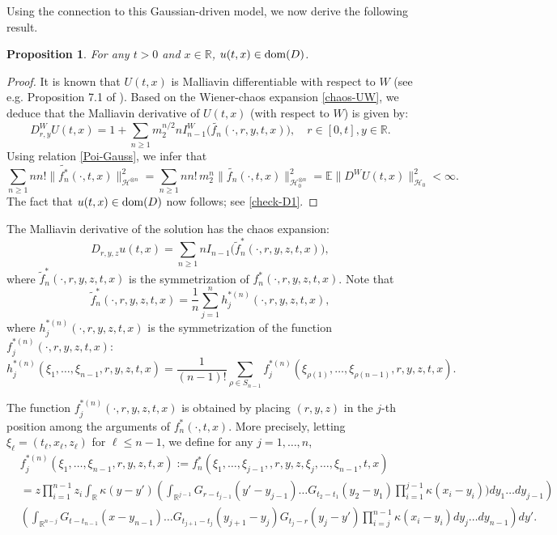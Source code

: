 \documentclass[12pt]{article}
\newtheorem{proposition}[theorem]{Proposition}
\def\cH{\mathcal{H}}
\def\bE{\mathbb{E}}
\def\bR{\mathbb{R}}
\def\k{\kappa}
\begin{document}
\medskip

Using the connection to this Gaussian-driven model, we now derive the following result.

\begin{proposition}
\label{u-Mall1}
For any $t>0$ and $x \in \bR$, $u(t,x) \in {\rm dom}(D)$.
\end{proposition}

\begin{proof}
It is known that
$U(t,x)$ is Malliavin differentiable with respect to $W$ (see e.g. Proposition 7.1 of \cite{sanz05}). Based on the Wiener-chaos expansion \eqref{chaos-UW}, we deduce that the Malliavin derivative of $U(t,x)$ (with respect to $W$) is given by:
\[
D_{r,y}^W U(t,x)=1+\sum_{n\geq 1}m_2^{n/2}nI_{n-1}^W\big(\widetilde{f_n}(\cdot,r,y,t,x)\big), \quad r \in [0,t],y \in \bR.
\]
Using relation \eqref{Poi-Gauss}, we infer that
\[
\sum_{n\geq 1}n n! \|\widetilde{f_n^*}(\cdot,t,x)\|_{\cH^{\otimes n}}^2 =\sum_{n\geq 1}n n! \, m_2^{n} \|\widetilde{f_n}(\cdot,t,x)\|_{\cH_0^{\otimes n}}^2 =\bE\|D^W U(t,x)\|_{\cH_0}^2<\infty.
\]
The fact that $u(t,x)\in {\rm dom}(D)$ now follows; see \eqref{check-D1}.
\end{proof}


The Malliavin derivative of the solution has the chaos expansion:
\begin{equation}
\label{chaos-Du}
D_{r,y,z}u(t,x)=\sum_{n\geq 1}n I_{n-1}\big(\widetilde{f}_n^*(\cdot,r,y,z,t,x)\big),
\end{equation}
where $\widetilde{f}_n^*(\cdot,r,y,z,t,x)$ is the symmetrization of $f_n^*(\cdot,r,y,z,t,x)$. Note that
\begin{equation}
\label{fn*1}
\widetilde{f}_n^*(\cdot,r,y,z,t,x)=\frac{1}{n}\sum_{j=1}^{n}h_j^{*(n)}(\cdot,r,y,z,t,x),
\end{equation}
where $h_j^{*(n)}(\cdot,r,y,z,t,x)$ is the symmetrization of the function $f_j^{*(n)}(\cdot,r,y,z,t,x)$:
\[
h_j^{*(n)}(\xi_1,\ldots,\xi_{n-1},r,y,z,t,x)=\frac{1}{(n-1)!} \sum_{\rho \in S_{n-1}}f_j^{*(n)}(\xi_{\rho(1)},\ldots,\xi_{\rho(n-1)},r,y,z,t,x).
\]


The function $f_j^{*(n)}(\cdot,r,y,z,t,x)$ is obtained by placing $(r,y,z)$ in the $j$-th position among the arguments of $f_n^{*}(\cdot,t,x)$. More precisely, letting $\xi_{\ell}=(t_{\ell},x_{\ell},z_{\ell})$ for $\ell \leq n-1$, we define for any $j=1,\ldots,n$,
\begin{align*}
&  f_j^{*(n)}(\xi_1,\ldots,\xi_{n-1},r,y,z,t,x) :=f_n^{*}(\xi_1,\ldots,\xi_{j-1},,r,y,z,\xi_j,\ldots,
\xi_{n-1},t,x) \\
& = z \prod_{i=1}^{n-1}z_{i} \int_{\bR} \k(y-y') \left( \int_{\bR^{j-1}} G_{r-t_{j-1}}(y'-y_{j-1}) \ldots G_{t_2-t_1}(y_2-y_1) \prod_{i=1}^{j-1}\k(x_{i}-y_{i}) )dy_1 \ldots dy_{j-1} \right)\\
& \left( \int_{\bR^{n-j}} G_{t-t_{n-1}}(x-y_{n-1}) \ldots G_{t_{j+1}-t_j}(y_{j+1}-y_j)G_{t_j-r}(y_j-y') \prod_{i=j}^{n-1}\k(x_{i}-y_{i}) dy_j \ldots dy_{n-1}\right) dy'.
\end{align*}
\end{document}
